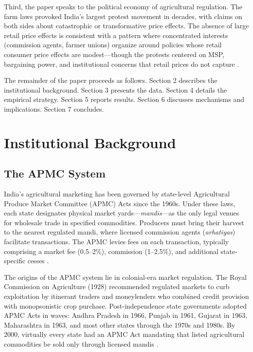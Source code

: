 \documentclass[12pt]{article}
\begin{document}
Third, the paper speaks to the political economy of agricultural regulation. The farm laws provoked India's largest protest movement in decades, with claims on both sides about catastrophic or transformative price effects. The absence of large retail price effects is consistent with a pattern where concentrated interests (commission agents, farmer unions) organize around policies whose retail consumer price effects are modest---though the protests centered on MSP, bargaining power, and institutional concerns that retail prices do not capture \citep{stigler1971theory, peltzman1976toward, aggarwal2024political}.

The remainder of the paper proceeds as follows. Section 2 describes the institutional background. Section 3 presents the data. Section 4 details the empirical strategy. Section 5 reports results. Section 6 discusses mechanisms and implications. Section 7 concludes.


\section{Institutional Background}

\subsection{The APMC System}

India's agricultural marketing has been governed by state-level Agricultural Produce Market Committee (APMC) Acts since the 1960s. Under these laws, each state designates physical market yards---\textit{mandis}---as the only legal venues for wholesale trade in specified commodities. Producers must bring their harvest to the nearest regulated mandi, where licensed commission agents (\textit{arhatiyas}) facilitate transactions. The APMC levies fees on each transaction, typically comprising a market fee (0.5--2\%), commission (1--2.5\%), and additional state-specific cesses \citep{chand2012development}.

The origins of the APMC system lie in colonial-era market regulation. The Royal Commission on Agriculture (1928) recommended regulated markets to curb exploitation by itinerant traders and moneylenders who combined credit provision with monopsonistic crop purchase. Post-independence state governments adopted APMC Acts in waves: Andhra Pradesh in 1966, Punjab in 1961, Gujarat in 1963, Maharashtra in 1963, and most other states through the 1970s and 1980s. By 2000, virtually every state had an APMC Act mandating that listed agricultural commodities be sold only through licensed mandis \citep{bardhan2019interlinkage, acharya2006marketing}.
\end{document}
